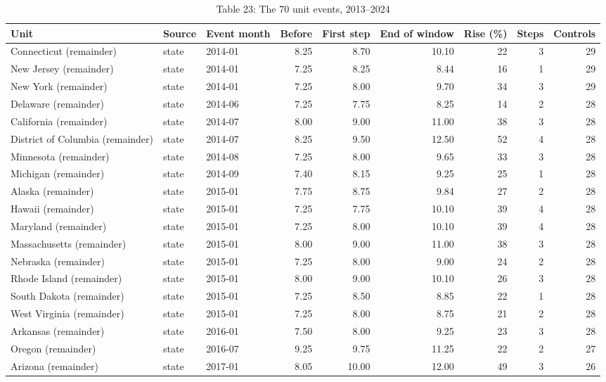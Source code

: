 \documentclass[12pt]{article}
\begin{document}
\begin{table}
\centering
\caption{Table 23: The 70 unit events, 2013--2024}

\scriptsize
\begin{tabular}{lllrrrrrr}
\toprule
Unit & Source & Event month & Before & First step & End of window & Rise (\%) & Steps & Controls \\
\midrule
Connecticut (remainder) & state & 2014-01 & 8.25 & 8.70 & 10.10 & 22 & 3 & 29 \\
New Jersey (remainder) & state & 2014-01 & 7.25 & 8.25 & 8.44 & 16 & 1 & 29 \\
New York (remainder) & state & 2014-01 & 7.25 & 8.00 & 9.70 & 34 & 3 & 29 \\
Delaware (remainder) & state & 2014-06 & 7.25 & 7.75 & 8.25 & 14 & 2 & 28 \\
California (remainder) & state & 2014-07 & 8.00 & 9.00 & 11.00 & 38 & 3 & 28 \\
District of Columbia (remainder) & state & 2014-07 & 8.25 & 9.50 & 12.50 & 52 & 4 & 28 \\
Minnesota (remainder) & state & 2014-08 & 7.25 & 8.00 & 9.65 & 33 & 3 & 28 \\
Michigan (remainder) & state & 2014-09 & 7.40 & 8.15 & 9.25 & 25 & 1 & 28 \\
Alaska (remainder) & state & 2015-01 & 7.75 & 8.75 & 9.84 & 27 & 2 & 28 \\
Hawaii (remainder) & state & 2015-01 & 7.25 & 7.75 & 10.10 & 39 & 4 & 28 \\
Maryland (remainder) & state & 2015-01 & 7.25 & 8.00 & 10.10 & 39 & 4 & 28 \\
Massachusetts (remainder) & state & 2015-01 & 8.00 & 9.00 & 11.00 & 38 & 3 & 28 \\
Nebraska (remainder) & state & 2015-01 & 7.25 & 8.00 & 9.00 & 24 & 2 & 28 \\
Rhode Island (remainder) & state & 2015-01 & 8.00 & 9.00 & 10.10 & 26 & 3 & 28 \\
South Dakota (remainder) & state & 2015-01 & 7.25 & 8.50 & 8.85 & 22 & 1 & 28 \\
West Virginia (remainder) & state & 2015-01 & 7.25 & 8.00 & 8.75 & 21 & 2 & 28 \\
Arkansas (remainder) & state & 2016-01 & 7.50 & 8.00 & 9.25 & 23 & 3 & 28 \\
Oregon (remainder) & state & 2016-07 & 9.25 & 9.75 & 11.25 & 22 & 2 & 27 \\
Arizona (remainder) & state & 2017-01 & 8.05 & 10.00 & 12.00 & 49 & 3 & 26 \\

\end{tabular}
\end{table}
\end{document}
